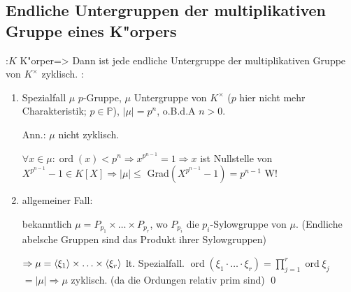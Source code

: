 \subsection{Endliche Untergruppen der multiplikativen Gruppe eines K"orpers}
\theorem:$K$ K"orper=>{
  Dann ist jede endliche Untergruppe 
  der multiplikativen Gruppe von $K^{\times}$ zyklisch.
  }
\proof {}:{\begin{enumerate}
 \item Spezialfall $\mu$ $p$-Gruppe, $\mu$ Untergruppe von $K^{\times}$ ($p$ hier nicht mehr Charakteristik;
 $p\in \mathbb{P}$), $|\mu|=p^n$, o.B.d.A $n>0$.
 
 Ann.: $\mu$ nicht zyklisch.
 
 $\forall x\in \mu:\operatorname{ord}(x)<p^n\Rightarrow x^{p^{n-1}}=1 \Rightarrow x$ ist 
 Nullstelle von $X^{p^{n-1}}-1\in K[X] \Rightarrow |\mu|\leq$ Grad$(X^{p^{n-1}}-1)=p^{n-1}$
 W!
 \item allgemeiner Fall:
 
 bekanntlich $\mu=P_{p_1}\times \ldots \times P_{p_r}$, wo $P_{p_i}$ die $p_i$-Sylowgruppe
 von $\mu$. (Endliche abelsche Gruppen sind das Produkt ihrer Sylowgruppen)
 
 $\Rightarrow \mu={\left\langle\xi_1\right\rangle}\times \ldots \times {\left\langle\xi_r\right\rangle}$ lt. Spezialfall.
 $\operatorname{ord}(\xi_1\cdot \ldots \cdot \xi_r)=\prod_{j=1}^{r}\operatorname{ord}\xi_j$
 $=|\mu|\Rightarrow \mu$ zyklisch. (da die Ordungen relativ prim sind)
 \qed
  
 \end{enumerate}}
